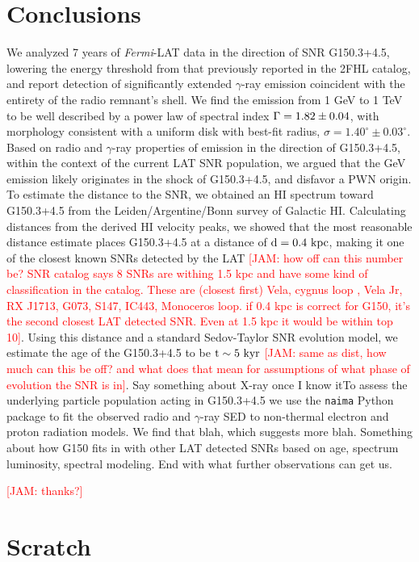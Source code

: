 \documentclass[iop]{emulateapj}
\newcommand{\kibitz}[2]{\ifnum\Comments=1\textcolor{#1}{#2}\fi}
\newcommand{\jamie}[1]{\kibitz{red}      {[JAM: #1]}}
\newcommand{\gam}{$\gamma$-ray}
\newcommand{\FermiLat}{\emph{Fermi}-LAT }     %
\newcommand{\nai}{{\tt naima}}
\newcommand{\Gone}{G150.3+4.5}
\begin{document}
\section{Conclusions}\label{sec:Conc}
We analyzed 7 years of \FermiLat{} data in the direction of SNR \Gone{}, lowering the energy threshold from that previously reported in the 2FHL catalog, and report detection of significantly extended \gam{} emission coincident with the entirety of the radio remnant's shell. We find the emission from 1 GeV to 1 TeV to be well described by a power law of spectral index ${\Gamma = \rm 1.82 \pm 0.04}$, with  morphology consistent with a uniform disk with best-fit radius, {\rm $\sigma = 1.40^{\circ} \pm 0.03^{\circ}$}.  Based on radio and  \gam{} properties of emission in the direction of \Gone{}, within the context of the current LAT SNR population, we argued that the GeV emission likely originates in the shock of \Gone{}, and disfavor a PWN origin. To estimate the distance to the SNR, we obtained  an HI spectrum toward \Gone{} from the Leiden/Argentine/Bonn survey of Galactic HI. Calculating distances from the derived HI velocity peaks, we showed that the most reasonable distance estimate places \Gone{} at a distance of ${\rm d = 0.4~kpc}$, making it one of the closest known SNRs detected by the LAT \jamie{how off can this number be? SNR catalog says 8 SNRs are withing 1.5 kpc and have some kind of classification in the catalog. These are (closest first) Vela, cygnus loop , Vela Jr, RX J1713, G073, S147, IC443, Monoceros loop. if 0.4 kpc is correct for G150, it's the second closest LAT detected SNR. Even at 1.5 kpc it would be within top 10}. Using this distance and a standard Sedov-Taylor SNR evolution model, we estimate the age of the \Gone{} to be ${\rm t \sim 5~kyr}$ \jamie{same as dist, how much can this be off? and what does that mean for assumptions of what phase of evolution the SNR is in}. Say something about X-ray once I know itTo assess the underlying particle population acting in \Gone{} we use the \nai{} Python package to fit the observed radio and \gam{} SED to non-thermal electron and proton radiation models. We find that blah, which suggests more blah. Something about how G150  fits in with other LAT detected SNRs based on age, spectrum luminosity, spectral modeling. End with what  further observations can get us.

\jamie{thanks?}

\section{Scratch}
\end{document}
